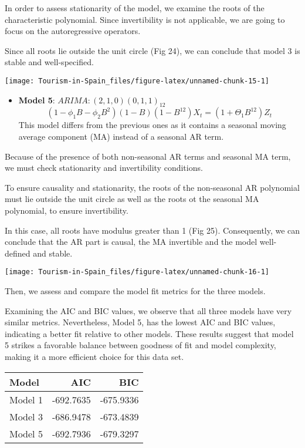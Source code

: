 \documentclass[
]{article}
\providecommand{\tightlist}{%
  \setlength{\itemsep}{0pt}\setlength{\parskip}{0pt}}
\begin{document}
In order to assess stationarity of the model, we examine the roots of
the characteristic polynomial. Since invertibility is not applicable, we
are going to focus on the autoregressive operators.

Since all roots lie outside the unit circle (Fig 24), we can conclude
that model 3 is stable and well-specified.

\begin{center}\texttt{[image: Tourism-in-Spain\_files/figure-latex/unnamed-chunk-15-1]} \end{center}

\begin{itemize}
\tightlist
\item
  \textbf{Model 5}: \(ARIMA: (2, 1, 0)(0, 1, 1)_{12}\)
  \[(1 - \phi_{1}B - \phi_{2}B^2)(1 - B)(1 - B^{12})X_t = (1 + \Theta_{1}B^{12}) Z_t\]
  This model differs from the previous ones as it contains a seasonal
  moving average component (MA) instead of a seasonal AR term.
\end{itemize}

Because of the presence of both non-seasonal AR terms and seasonal MA
term, we must check stationarity and invertibility conditions.

To ensure causality and stationarity, the roots of the non-seasonal AR
polynomial must lie outside the unit circle as well as the roots ot the
seasonal MA polynomial, to ensure invertibility.

In this case, all roots have modulus greater than 1 (Fig 25).
Consequently, we can conclude that the AR part is causal, the MA
invertible and the model well-defined and stable.

\begin{center}\texttt{[image: Tourism-in-Spain\_files/figure-latex/unnamed-chunk-16-1]} \end{center}

Then, we assess and compare the model fit metrics for the three models.

Examining the AIC and BIC values, we observe that all three models have
very similar metrics. Nevertheless, Model 5, has the lowest AIC and BIC
values, indicating a better fit relative to other models. These results
suggest that model 5 strikes a favorable balance between goodness of fit
and model complexity, making it a more efficient choice for this data
set.

\begin{longtable}[]{@{}lrr@{}}
\toprule\noalign{}
Model & AIC & BIC \\
\midrule\noalign{}
\endhead
\bottomrule\noalign{}
\endlastfoot
Model 1 & -692.7635 & -675.9336 \\
Model 3 & -686.9478 & -673.4839 \\
Model 5 & -692.7936 & -679.3297 \\
\end{longtable}
\end{document}
